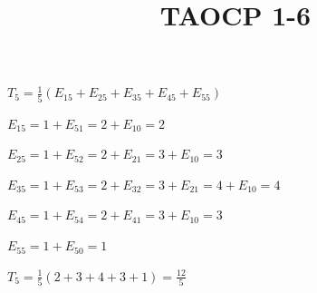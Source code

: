 \documentclass{article}
\title{TAOCP 1\mbox{-}6}
\begin{document}
\maketitle

\( T_{5} = \frac{1}{5} (E_{15} + E_{25} + E_{35} + E_{45} + E_{55}) \)

\( E_{15} = 1 + E_{51} = 2 + E_{10} = 2 \)

\( E_{25} = 1 + E_{52} = 2 + E_{21} = 3 + E_{10} = 3 \)

\( E_{35} = 1 + E_{53} = 2 + E_{32} = 3 + E_{21} = 4 + E_{10} = 4 \)

\( E_{45} = 1 + E_{54} = 2 + E_{41} = 3 + E_{10} = 3 \)

\( E_{55} = 1 + E_{50} = 1 \)

\( T_{5} = \frac{1}{5} (2 + 3 + 4 + 3 + 1) = \frac{12}{5} \)
\end{document}

